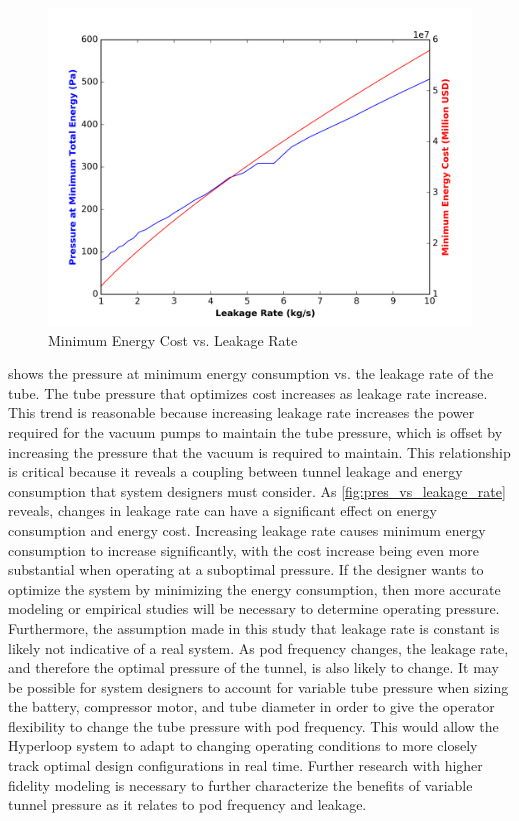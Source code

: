 \begin{figure}
	\centering
	\includegraphics{../../images/graphs/leakage_trades/leakage_vs_energy.png}
	\caption{Minimum Energy Cost vs. Leakage Rate}
	\label{fig:pres_vs_energy}
\end{figure}
 shows the pressure at minimum energy
consumption vs. the leakage rate of the tube. The tube pressure that optimizes
cost increases as leakage rate increase. This trend is reasonable because
increasing leakage rate increases the power required for the vacuum pumps to
maintain the tube pressure, which is offset by increasing the pressure that the
vacuum is required to maintain. This relationship is critical because it
reveals a coupling between tunnel leakage and energy consumption that system
designers must consider. As \cref{fig:pres_vs_leakage_rate} reveals, changes
in leakage rate can have a significant effect on energy consumption and energy cost.
Increasing leakage rate causes minimum energy consumption to increase
significantly, with the cost increase being even more substantial when
operating at a suboptimal pressure. If the designer wants to optimize the
system by minimizing the energy consumption, then more accurate modeling or
empirical studies will be necessary to determine operating pressure.
Furthermore, the assumption made in this study that leakage rate is constant is
likely not indicative of a real system. As pod frequency changes, the
leakage rate, and therefore the optimal pressure of the tunnel, is also likely to change.
It may be possible for system designers to account for variable tube pressure
when sizing the battery, compressor motor, and tube diameter in order to give
the operator flexibility to change the tube pressure with pod frequency.
This would allow the Hyperloop system to adapt to changing operating conditions
to more closely track optimal design configurations in real time.
Further research with higher fidelity modeling is necessary to further
characterize the benefits of variable tunnel pressure as it relates to pod frequency and leakage.
